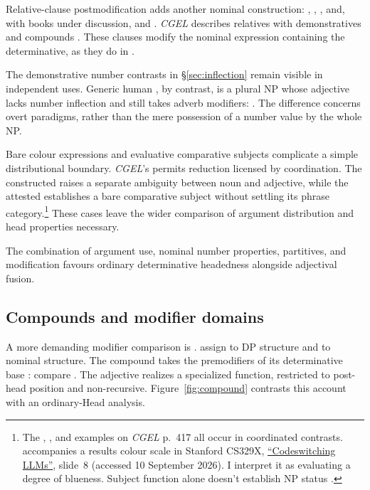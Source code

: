 \documentclass[12pt]{article}
\begin{document}
Relative-clause postmodification adds another nominal construction: , , , and, with books under discussion,  and . \textit{CGEL} describes relatives with demonstratives and compounds \citep[414, 422--423]{huddleston2002}. These clauses modify the nominal expression containing the determinative, as they do in .

The demonstrative number contrasts in §\ref{sec:inflection} remain visible in independent uses. Generic human , by contrast, is a plural NP whose adjective lacks number inflection and still takes adverb modifiers:  \citep[418]{huddleston2002}. The difference concerns overt paradigms, rather than the mere possession of a number value by the whole NP.

Bare colour expressions and evaluative comparative subjects complicate a simple distributional boundary. \textit{CGEL}'s  permits reduction licensed by coordination. The constructed  raises a separate ambiguity between noun and adjective, while the attested  establishes a bare comparative subject without settling its phrase category.\footnote{The , , and  examples on \textit{CGEL} p.~417 all occur in coordinated contrasts.  accompanies a results colour scale in Stanford CS329X, \href{https://web.stanford.edu/class/cs329x/slides/Lecture12_B_Codeswitching\%20LLMs.pdf}{\enquote{Codeswitching LLMs}}, slide~8 (accessed 10 September 2026). I interpret it as evaluating a degree of blueness. Subject function alone doesn't establish NP status \citep[236]{huddleston2002}.} These cases leave the wider comparison of argument distribution and head properties necessary.

The combination of argument use, nominal number properties, partitives, and modification favours ordinary determinative headedness alongside adjectival fusion.

\subsection{Compounds and modifier domains}\label{sec:compounds}

A more demanding modifier comparison is . \textcite[581--583]{Payne2007} assign  to DP structure and  to nominal structure. The compound  takes the premodifiers of its determinative base : compare . The adjective realizes a specialized  function, restricted to post-head position and non-recursive. Figure~\ref{fig:compound} contrasts this account with an ordinary-Head analysis.
\end{document}
